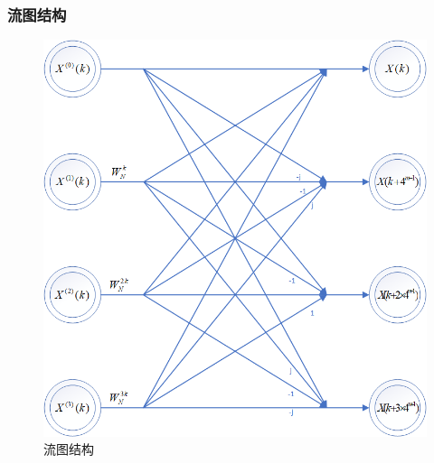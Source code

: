 \documentclass{../source/zjureport}
\begin{document}
            \subsubsection{流图结构}
            \begin{figure}[H]
                \centering
                \includegraphics[scale = 0.5]{figure/基础蝶形运算.png}
                \caption{流图结构}
            \end{figure}
\end{document}
